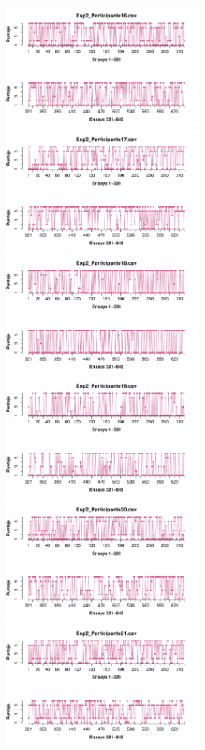 \documentclass[a4paper ]{article}
\begin{document}
\begin{figure}[th]
\begin{center}
\includegraphics[width=8cm, height=4cm]{Figures/Rating_Exp2_P16} \includegraphics[width=8cm, height=4cm]{Figures/Rating_Exp2_P17} \includegraphics[width=8cm, height=4cm]{Figures/Rating_Exp2_P18}
\includegraphics[width=8cm, height=4cm]{Figures/Rating_Exp2_P19} \includegraphics[width=8cm, height=4cm]{Figures/Rating_Exp2_P20} \includegraphics[width=8cm, height=4cm]{Figures/Rating_Exp2_P21}
\end{center}
\end{figure}
\clearpage
\end{document}
